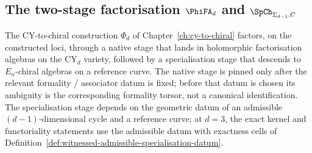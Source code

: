 \subsection{The two-stage factorisation \texorpdfstring{$\PhiFA_d$}{PhiFA-d} and \texorpdfstring{$\SpCh_{\Sigma_{d-1}, C}$}{SpCh-Sigma-d-1, C}}
\label{subsec:phi-fa-spch-framework}

The CY-to-chiral construction $\Phi_d$ of Chapter~\ref{ch:cy-to-chiral}
factors, on the constructed loci, through a native stage that lands in
holomorphic factorisation algebras on the CY$_d$ variety, followed by a
specialisation stage that descends to $E_n$-chiral algebras on a
reference curve. The native stage is pinned only after the relevant
formality / associator datum is fixed; before that datum is chosen its
ambiguity is the corresponding formality torsor, not a canonical
identification. The specialisation stage depends on the geometric
datum of an admissible $(d-1)$-dimensional cycle and a reference curve;
at $d=3$, the exact kernel and functoriality statements use the
admissible datum with exactness cells of
Definition~\ref{def:witnessed-admissible-specialisation-datum}.

